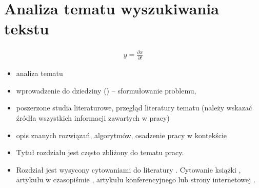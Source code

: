 \chapter{Analiza tematu wyszukiwania tekstu}  %
% 


%
\begin{align}
    y = \frac{\partial x}{\partial t}
\end{align}


\begin{itemize}
\item analiza tematu
\item wprowadzenie do dziedziny () – sformułowanie problemu, 
\item poszerzone studia literaturowe, przegląd literatury tematu (należy wskazać źródła wszystkich informacji zawartych w pracy)
\item opis znanych rozwiązań, algorytmów, osadzenie pracy w kontekście
\item Tytuł rozdziału jest często zbliżony do tematu pracy. 
\item Rozdział jest wysycony cytowaniami do literatury \cite{bib:artykul,bib:ksiazka,bib:konferencja}. 
Cytowanie książki \cite{bib:ksiazka}, artykułu w czasopiśmie \cite{bib:artykul}, artykułu konferencyjnego \cite{bib:konferencja} lub strony internetowej \cite{bib:internet}.
\end{itemize}

%
%
